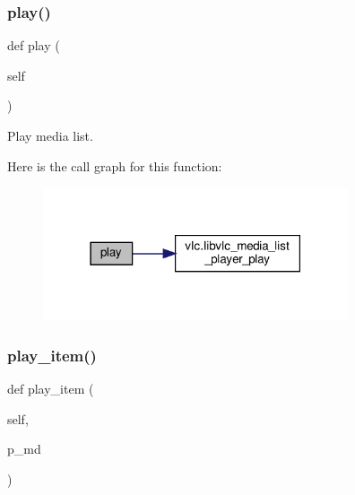 \subsubsection{\texorpdfstring{play()}{play()}}
{\footnotesize\ttfamily def play (\begin{DoxyParamCaption}\item[{}]{self }\end{DoxyParamCaption})}

\begin{DoxyVerb}Play media list.
\end{DoxyVerb}
 Here is the call graph for this function\+:
\nopagebreak
\begin{figure}[H]
\begin{center}
\leavevmode
\includegraphics[width=255pt]{classvlc_1_1_media_list_player_a9942567d8012950a20b0798b4203bb57_cgraph}
\end{center}
\end{figure}
\mbox{\label{classvlc_1_1_media_list_player_a7b4dea65b1a9aebd68903e99c8f2a35b}} 
\subsubsection{\texorpdfstring{play\+\_\+item()}{play\_item()}}
{\footnotesize\ttfamily def play\+\_\+item (\begin{DoxyParamCaption}\item[{}]{self,  }\item[{}]{p\+\_\+md }\end{DoxyParamCaption})}

